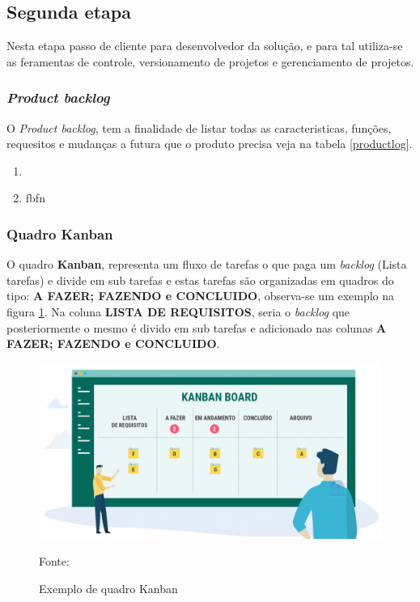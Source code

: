 \subsection{Segunda etapa}
\par Nesta etapa passo de cliente para desenvolvedor da solução, e para tal utiliza-se as feramentas de controle, versionamento de projetos e gerenciamento de projetos.


\subsubsection{\textit{Product backlog}}
\par O \textit{Product backlog}, tem a finalidade de listar todas as caracteristicas, funções, requesitos e mudanças a futura que o produto precisa veja na tabela \ref{productlog}.
 \begin{enumerate}
    \item{}
   \item fbfn
 \end{enumerate}\label{productlog}

\subsubsection{Quadro Kanban}
\par O quadro \textbf{Kanban}, representa um fluxo de tarefas o que paga um \textit{backlog} (Lista tarefas) e divide em sub tarefas e estas tarefas são organizadas em quadros do tipo: \textbf{A FAZER; FAZENDO e CONCLUIDO}, observa-se um exemplo na figura \ref{fig:kbn}. Na coluna \textbf{LISTA DE REQUISITOS}, seria o \textit{backlog} que posteriormente o mesmo é divido em sub tarefas e adicionado nas colunas \textbf{A FAZER; FAZENDO e CONCLUIDO}.

\begin{figure}[H] %
  \center
  \caption{Exemplo de quadro Kanban}

  \includegraphics[width=\textwidth]{figure/kbn.png}

  \raggedright
  {\fontsize{10pt}{\baselineskip}\selectfont Fonte: }
  \label{fig:kbn}
\end{figure}


